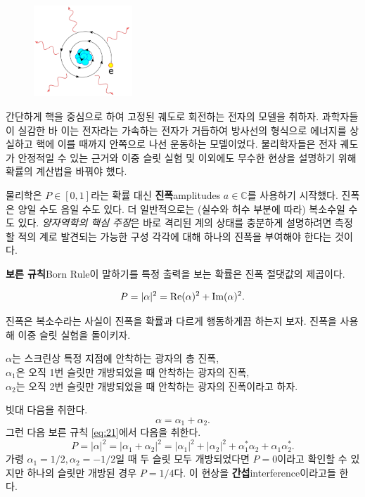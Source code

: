 \documentclass[a4paper,chapter,atbegshi,]{oblivoir}
\begin{document}
\begin{figure}
    \centering
    \includegraphics[width=0.33\textwidth]{iqis1_008}
\end{figure}

간단하게 핵을 중심으로 하여 고정된 궤도로 회전하는 전자의 모델을 취하자.
과학자들이 실감한 바 이는 전자라는 가속하는 전자가 거듭하여 방사선의
형식으로 에너지를 상실하고 핵에 이를 때까지 안쪽으로 나선 운동하는 모델이었다.
물리학자들은 전자 궤도가 안정적일 수 있는 근거와 이중 슬릿 실험 및 이외에도
무수한 현상을 설명하기 위해 확률의 계산법을 바꿔야 했다. 

물리학은 $P\in[0,1]$라는 확률 대신 \textbf{진폭}{\footnotesize amplitudes}
$a\in\mathbb{C}$를 사용하기 시작했다. 진폭은 양일 수도 음일 수도 있다. 더
일반적으로는 (실수와 허수 부분에 따라) 복소수일 수도 있다. \emph{양자역학의
핵심 주장}은 바로 격리된 계의 상태를 충분하게 설명하려면 측정할 적의 계로
발견되는 가능한 구성 각각에 대해 하나의 진폭을 부여해야 한다는 것이다.

\textbf{보른 규칙}{\footnotesize Born Rule}이 말하기를 특정 출력을 보는 확률은
진폭 절댓값의 제곱이다.

\begin{equation}{\label{eq:21}}
  P = |\alpha|^2=\textrm{Re}(\alpha)^2+\textrm{Im}(\alpha)^2.
\end{equation}

진폭은 복소수라는 사실이 진폭을 확률과 다르게 행동하게끔 하는지 보자. 진폭을
사용해 이중 슬릿 실험을 돌이키자.

\hfill

\hfill\parbox[t]{12cm}{
  $\alpha$는 스크린상 특정 지점에 안착하는 광자의 총 진폭,\\
  $\alpha_1$은 오직 1번 슬릿만 개방되었을 때 안착하는 광자의 진폭,\\
  $\alpha_2$는 오직 2번 슬릿만 개방되었을 때 안착하는 광자의 진폭이라고 하자.
}

\hfill\break

 빗대 다음을 취한다.
\begin{equation}
  \alpha = \alpha_1+\alpha_2.
\end{equation}
그런 다음 보른 규칙 \ref{eq:21}에서 다음을 취한다.
\begin{equation}
  P = |\alpha|^2=|\alpha_1+\alpha_2|^2=|\alpha_1|^2+|\alpha_2|^2+
  \alpha_1^*\alpha_2+\alpha_1\alpha_2^*.
\end{equation}
가령 $\alpha_1=1/2, \alpha_2=-1/2$일 때 두 슬릿 모두 개방되었다면 $P=0$이라고
확인할 수 있지만 하나의 슬릿만 개방된 경우 $P=1/4$다. 이 현상을
\textbf{간섭}{\footnotesize interference}이라고들 한다.
\end{document}

